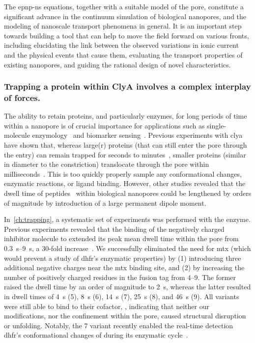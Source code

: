 The \gls{epnp-ns} equations, together with a suitable model of the pore, constitute a significant advance in
the continuum simulation of biological nanopores, and the modeling of nanoscale transport phenomena in
general. It is an important step towards building a tool that can help to move the field forward on various
fronts, including elucidating the link between the observed variations in ionic current and the physical
events that cause them, evaluating the transport properties of existing nanopores, and guiding the rational
design of novel characteristics.


\subsubsection{Trapping a protein within {ClyA} involves a complex interplay of forces.}
%

The ability to retain proteins, and particularly enzymes, for long periods of time within a nanopore is of
crucial importance for applications such as single-molecule
enzymology~\cite{Willems-VanMeervelt-2017,VanMeervelt-2014,Wloka-2017,Thakur-2019,Galenkamp-2020} and
biomarker sensing~\cite{VanMeervelt-2017,Galenkamp-2018,Zernia-2020}. Previous experiments with \gls{clya}
have shown that, whereas large(r) proteins (that can still enter the pore through the \cisi{} entry) can
remain trapped for seconds to
minutes~\cite{Soskine-2013,Soskine-2012,Soskine-Biesemans-2015,Biesemans-2015,VanMeervelt-2014,VanMeervelt-2017},
smaller proteins (similar in diameter to the \transi{} constriction) translocate through the pore within
milliseconds~\cite{Soskine-2012}. This is too quickly properly sample any conformational changes, enzymatic
reactions, or ligand binding. However, other studies revealed that the dwell time of
peptides~\cite{Movileanu-2005,Asandei-2015,Asandei-2016} within biological nanopores could be lengthened by
orders of magnitude by introduction of a large permanent dipole moment.

In~\cref{ch:trapping}, a systematic set of experiments was performed with the \DHFRt{} enzyme. Previous
experiments revealed that the binding of the negatively charged inhibitor molecule  to \DHFRt{}
extended its peak mean dwell time within the pore from \SIrange{0.3}{9}{\second}, a 30-fold
increase~\cite{Soskine-Biesemans-2015}. We successfully eliminated the need for \gls{mtx} (which would prevent
a study of \gls{dhfr}'s enzymatic properties) by (1) introducing three additional negative charges near the
\gls{mtx} binding site, and (2) by increasing the number of positively charged residues in the fusion tag from
\numrange{+4}{+9}. The former raised the dwell time by an order of magnitude to \SI{2}{\second}, whereas the
latter resulted in dwell times of \SI{4}{\second} (\num{+5}), \SI{8}{\second} (\num{+6}), \SI{14}{\second}
(\num{+7}), \SI{25}{\second} (\num{+8}), and \SI{46}{\second} (\num{+9}). All variants were still able to bind
to their cofactor, , indicating that neither our modifications, nor the confinement within the pore,
caused structural disruption or unfolding. Notably, the \num{+7} \DHFRt{} variant recently enabled the
real-time detection \gls{dhfr}'s conformational changes of during its enzymatic cycle~\cite{Galenkamp-2020}.

